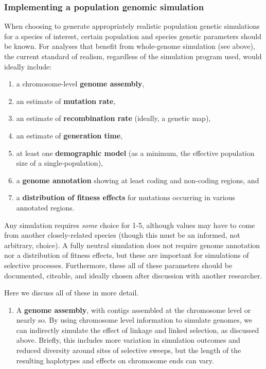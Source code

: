 \documentclass[hidelinks]{article}
\providecommand{\tightlist}{%
\setlength{\itemsep}{0pt}\setlength{\parskip}{0pt}}
\begin{document}
\hypertarget{implementing-a-population-genomic-simulation}{%
\subsubsection*{Implementing a population genomic
simulation}\label{implementing-a-population-genomic-simulation}}

When choosing to generate appropriately realistic population genetic
simulations for a species of interest, certain population and species
genetic parameters should be known. For analyses that benefit from
whole-genome simulation (see above), the current standard of realism,
regardless of the simulation program used, would ideally include:

\begin{enumerate}
\def\labelenumi{\arabic{enumi}.}
\tightlist
\item
  a chromosome-level \textbf{genome assembly},
\item
  an estimate of \textbf{mutation rate},
\item
  an estimate of \textbf{recombination rate} (ideally, a genetic map),
\item
  an estimate of \textbf{generation time},
\item
  at least one \textbf{demographic model} (as a minimum, the effective
  population size of a single-population),
\item
  a \textbf{genome annotation} showing at least coding and non-coding
  regions, and
\item
  a \textbf{distribution of fitness effects} for mutations occurring in
  various annotated regions.
\end{enumerate}

Any simulation requires \emph{some} choice for 1-5, although values may
have to come from another closely-related species (though this must be
an informed, not arbitrary, choice). A fully neutral simulation does not
require genome annotation nor a distribution of fitness effects, but
these are important for simulations of selective processes. Furthermore,
these all of these parameters should be documented, citeable, and
ideally chosen after discussion with another researcher.

Here we discuss all of these in more detail.

\begin{enumerate}
\def\labelenumi{\arabic{enumi}.}
\tightlist
\item
  A \textbf{genome assembly}, with contigs assembled at the chromosome
  level or nearly so. By using chromosome level information to simulate
  genomes, we can indirectly simulate the effect of linkage and linked
  selection, as discussed above. Briefly, this includes more variation
  in simulation outcomes and reduced diversity around sites of selective
  sweeps, but the length of the resulting haplotypes and effects on
  chromosome ends can vary.
\end{enumerate}
\end{document}
